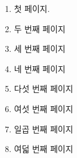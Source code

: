\documentclass{oblivoir}
\title{\mytitle}
\author{저자 이름}
\begin{document}
\begin{enumerate}
\item
첫 페이지.

\newpage
\item 두 번째 페이지 
\newpage
\item 세 번째 페이지 
\newpage
\item 네 번째 페이지 
\newpage
\item 다섯 번째 페이지 
\newpage
\item 여섯 번째 페이지 
\newpage
\item 일곱 번째 페이지 
\newpage
\item 여덟 번째 페이지 


\end{enumerate}
\end{document}
